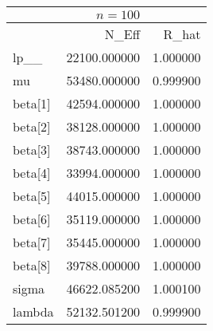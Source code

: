 \begin{tabular}{lrr}
& $ n = 100 $ & \\
\toprule
 & N\_Eff & R\_hat \\
\midrule
lp\_\_ & 22100.000000 & 1.000000 \\
mu & 53480.000000 & 0.999900 \\
beta[1] & 42594.000000 & 1.000000 \\
beta[2] & 38128.000000 & 1.000000 \\
beta[3] & 38743.000000 & 1.000000 \\
beta[4] & 33994.000000 & 1.000000 \\
beta[5] & 44015.000000 & 1.000000 \\
beta[6] & 35119.000000 & 1.000000 \\
beta[7] & 35445.000000 & 1.000000 \\
beta[8] & 39788.000000 & 1.000000 \\
sigma & 46622.085200 & 1.000100 \\
lambda & 52132.501200 & 0.999900 \\
\bottomrule
\end{tabular}
